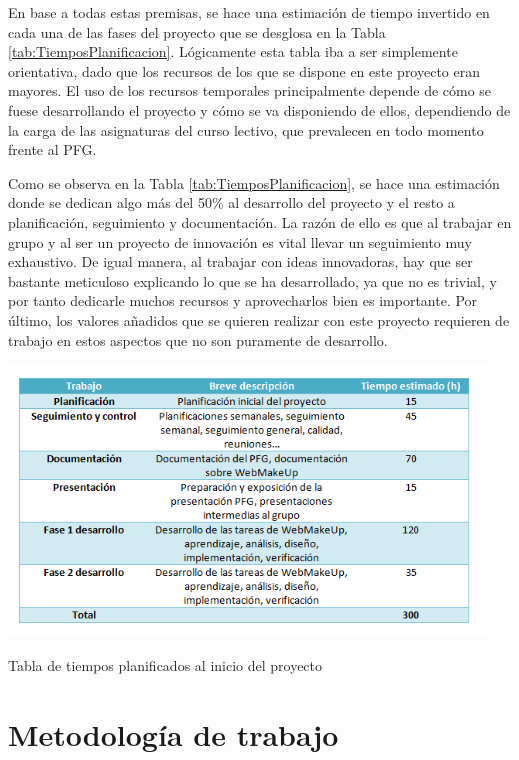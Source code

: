 En base a todas estas premisas, se hace una estimación de tiempo invertido en cada una de las fases del proyecto que se desglosa en la Tabla \ref{tab:TiemposPlanificacion}. Lógicamente esta tabla iba a ser simplemente orientativa, dado que los recursos de los que se dispone en este proyecto eran mayores. El uso de los recursos temporales principalmente depende de cómo se fuese desarrollando el proyecto y cómo se va disponiendo de ellos, dependiendo de la carga de las asignaturas del curso lectivo, que prevalecen en todo momento frente al PFG.

Como se observa en la Tabla \ref{tab:TiemposPlanificacion}, se hace una estimación donde se dedican algo más del 50\% al desarrollo del proyecto y el resto a planificación, seguimiento y documentación. La razón de ello es que al trabajar en grupo y al ser un proyecto de innovación es vital llevar un seguimiento muy exhaustivo. De igual manera, al trabajar con ideas innovadoras, hay que ser bastante meticuloso explicando lo que se ha desarrollado, ya que no es trivial, y por tanto dedicarle muchos recursos y aprovecharlos bien es importante. Por último, los valores añadidos que se quieren realizar con este proyecto requieren de trabajo en estos aspectos que no son puramente de desarrollo.

\begin{table}
\begin{center}
\includegraphics[width=0.95\textwidth]{figs/6-TiemposPlanificacion.png}
\caption{Tabla de tiempos planificados al inicio del proyecto}
\label{tab:TiemposPlanificacion}
\end{center}
\end{table}

\section{Metodología de trabajo}
\label{sec:MetodologiaTrabajo}

